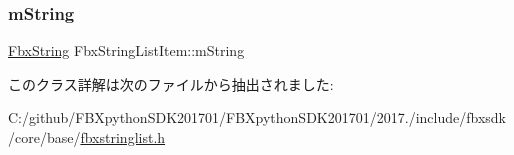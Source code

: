 \subsubsection{\texorpdfstring{m\+String}{mString}}
{\footnotesize\ttfamily \hyperlink{class_fbx_string}{Fbx\+String} Fbx\+String\+List\+Item\+::m\+String}



このクラス詳解は次のファイルから抽出されました\+:\begin{DoxyCompactItemize}
\item 
C\+:/github/\+F\+B\+Xpython\+S\+D\+K201701/\+F\+B\+Xpython\+S\+D\+K201701/2017./include/fbxsdk/core/base/\hyperlink{fbxstringlist_8h}{fbxstringlist.\+h}\end{DoxyCompactItemize}
